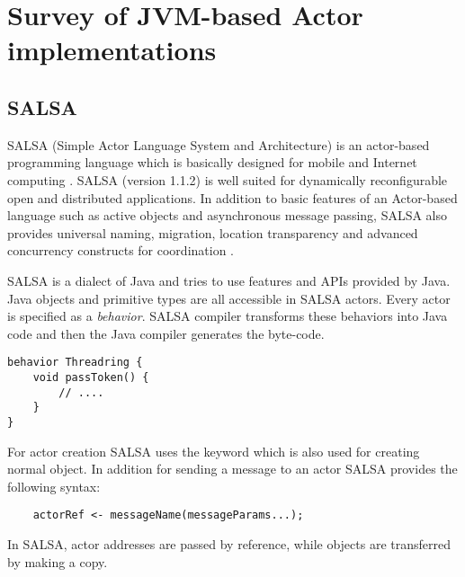 




\section{Survey of JVM-based Actor implementations}
\subsection{SALSA}
SALSA (Simple Actor Language System and Architecture) is an actor-based programming language which is basically designed for mobile and Internet computing \cite{varela2001pdr}. SALSA (version 1.1.2) is well suited for dynamically reconfigurable open and distributed applications. In addition to basic features of an Actor-based language such as active objects and asynchronous message passing, SALSA also provides universal naming, migration, location transparency and advanced concurrency constructs for coordination \cite{SALSA_Man}.

SALSA is a dialect of Java and tries to use features and APIs provided by Java\cite{SALSA_Man}. Java objects and primitive types are all accessible in SALSA actors. Every actor is specified as a \textit{behavior}. SALSA compiler transforms these behaviors into Java code and then the Java compiler generates the byte-code.
\begin{verbatim}
behavior Threadring {
    void passToken() {
        // .... 
    }
}
\end{verbatim}
For actor creation SALSA uses the  keyword which is also used for creating normal object. In addition for sending a message to an actor SALSA provides the following syntax:
\begin{verbatim}
    actorRef <- messageName(messageParams...);
\end{verbatim}
In SALSA, actor addresses are passed by reference, while objects are transferred by making a copy.

